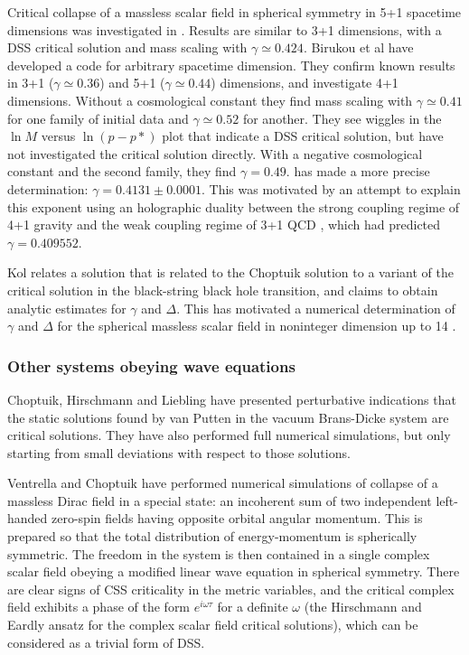 \documentclass{article}
\begin{document}
Critical collapse of a massless scalar field in spherical symmetry in
5+1 spacetime dimensions was investigated in
\cite{GarfinkleCutlerDuncan}. Results are similar to 3+1 dimensions,
with a DSS critical solution and mass scaling with $\gamma\simeq
0.424$. Birukou et al \cite{Birukou, Birukou2} have developed a code
for arbitrary spacetime dimension. They confirm known results in 3+1
($\gamma\simeq 0.36$) and 5+1 ($\gamma\simeq 0.44$) dimensions, and
investigate 4+1 dimensions. Without a cosmological constant they find
mass scaling with $\gamma\simeq 0.41$ for one family of initial data
and $\gamma\simeq 0.52$ for another. They see wiggles in the $\ln M$
versus $\ln(p-p*)$ plot that indicate a DSS critical solution, but
have not investigated the critical solution directly. With a negative
cosmological constant and the second family, they find
$\gamma=0.49$. \cite{BlandKunstatter} has made a more precise
determination: $\gamma=0.4131\pm 0.0001$.
This was motivated by an attempt to explain this exponent using
an holographic duality between the strong coupling regime of 4+1 gravity
and the weak coupling regime of 3+1 QCD
\cite{Alvarez-Gaume}, which had predicted $\gamma=0.409552$.

Kol \cite{Kol} relates a solution that is related to the Choptuik
solution to a variant of the critical solution in the black-string
black hole transition, and claims to obtain analytic estimates for
$\gamma$ and $\Delta$. This has motivated a numerical determination of
$\gamma$ and $\Delta$ for the spherical massless scalar field in
noninteger dimension up to 14 \cite{SorkinOren,BlandPreston}.


\subsubsection{Other systems obeying wave equations}

Choptuik, Hirschmann and Liebling \cite{ChopHirschLieb} have presented
perturbative indications that the static solutions found by van Putten
\cite{vanPutten} in the vacuum Brans-Dicke system are critical
solutions. They have also performed full numerical simulations, but
only starting from small deviations with respect to those solutions.

Ventrella and Choptuik \cite{VentrellaChoptuik} have performed numerical
simulations of collapse of a massless Dirac field in a special state:
an incoherent sum of two independent left-handed zero-spin fields
having opposite orbital angular momentum. This is prepared so that the
total distribution of energy-momentum is spherically symmetric. The
freedom in the system is then contained in a single complex scalar field
obeying a modified linear wave equation in spherical symmetry. There
are clear signs of CSS criticality in the metric variables, and the
critical complex field exhibits a phase of the form $e^{i\omega\tau}$
for a definite $\omega$ (the Hirschmann and Eardly ansatz for the
complex scalar field critical solutions), which can be considered as a
trivial form of DSS.
\end{document}

